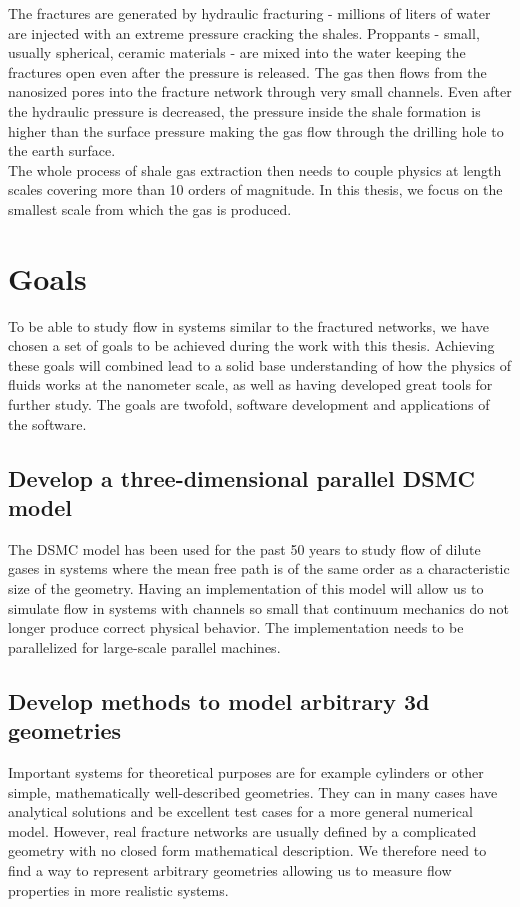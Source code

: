 The fractures are generated by hydraulic fracturing - millions of liters of water are injected with an extreme pressure cracking the shales. Proppants - small, usually spherical, ceramic materials - are mixed into the water keeping the fractures open even after the pressure is released. The gas then flows from the nanosized pores into the fracture network through very small channels. Even after the hydraulic pressure is decreased, the pressure inside the shale formation is higher than the surface pressure making the gas flow through the drilling hole to the earth surface.\\
The whole process of shale gas extraction then needs to couple physics at length scales covering more than 10 orders of magnitude. In this thesis, we focus on the smallest scale from which the gas is produced. 

\section{Goals}
\renewcommand{\thesubsection}{\thesection.\alph{subsection}}
To be able to study flow in systems similar to the fractured networks, we have chosen a set of goals to be achieved during the work with this thesis. Achieving these goals will combined lead to a solid base understanding of how the physics of fluids works at the nanometer scale, as well as having developed great tools for further study. The goals are twofold, software development and applications of the software. 
\subsection{Develop a three-dimensional parallel DSMC model}
\label{goal:dsmc_1}
The DSMC model has been used for the past 50 years to study flow of dilute gases in systems where the mean free path is of the same order as a characteristic size of the geometry. Having an implementation of this model will allow us to simulate flow in systems with channels so small that continuum mechanics do not longer produce correct physical behavior. The implementation needs to be parallelized for large-scale parallel machines.
\subsection{Develop methods to model arbitrary 3d geometries}
\label{goal:dsmc_2}
Important systems for theoretical purposes are for example cylinders or other simple, mathematically well-described geometries. They can in many cases have analytical solutions and be excellent test cases for a more general numerical model. However, real fracture networks are usually defined by a complicated geometry with no closed form mathematical description. We therefore need to find a way to represent arbitrary geometries allowing us to measure flow properties in more realistic systems.

